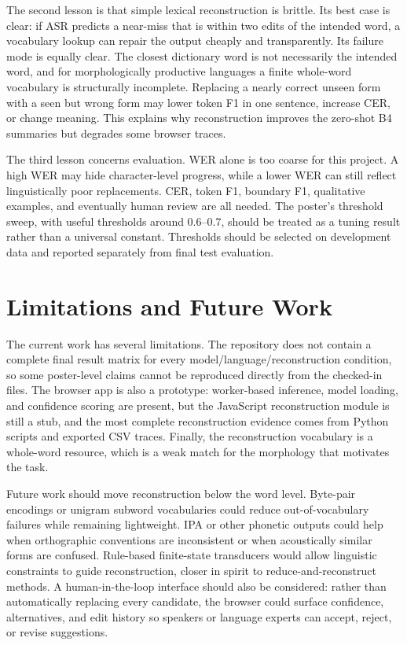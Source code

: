 \documentclass[11pt]{article}
\begin{document}
The second lesson is that simple lexical reconstruction is brittle. Its best case is clear: if ASR predicts a near-miss that is within two edits of the intended word, a vocabulary lookup can repair the output cheaply and transparently. Its failure mode is equally clear. The closest dictionary word is not necessarily the intended word, and for morphologically productive languages a finite whole-word vocabulary is structurally incomplete. Replacing a nearly correct unseen form with a seen but wrong form may lower token F1 in one sentence, increase CER, or change meaning. This explains why reconstruction improves the zero-shot B4 summaries but degrades some browser traces.

The third lesson concerns evaluation. WER alone is too coarse for this project. A high WER may hide character-level progress, while a lower WER can still reflect linguistically poor replacements. CER, token F1, boundary F1, qualitative examples, and eventually human review are all needed. The poster's threshold sweep, with useful thresholds around 0.6--0.7, should be treated as a tuning result rather than a universal constant. Thresholds should be selected on development data and reported separately from final test evaluation.

\section{Limitations and Future Work}

The current work has several limitations. The repository does not contain a complete final result matrix for every model/language/reconstruction condition, so some poster-level claims cannot be reproduced directly from the checked-in files. The browser app is also a prototype: worker-based inference, model loading, and confidence scoring are present, but the JavaScript reconstruction module is still a stub, and the most complete reconstruction evidence comes from Python scripts and exported CSV traces. Finally, the reconstruction vocabulary is a whole-word resource, which is a weak match for the morphology that motivates the task.

Future work should move reconstruction below the word level. Byte-pair encodings or unigram subword vocabularies could reduce out-of-vocabulary failures while remaining lightweight. IPA or other phonetic outputs could help when orthographic conventions are inconsistent or when acoustically similar forms are confused. Rule-based finite-state transducers would allow linguistic constraints to guide reconstruction, closer in spirit to reduce-and-reconstruct methods. A human-in-the-loop interface should also be considered: rather than automatically replacing every candidate, the browser could surface confidence, alternatives, and edit history so speakers or language experts can accept, reject, or revise suggestions.
\end{document}
